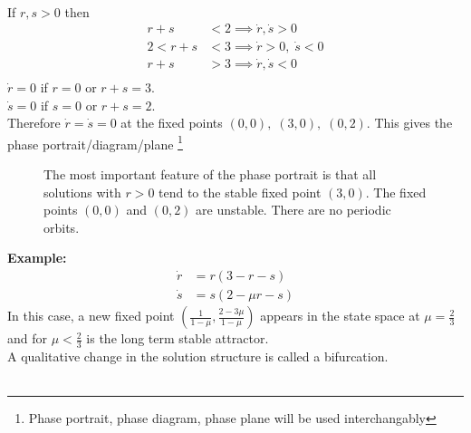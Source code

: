 \documentclass{article}
\newcommand{\example}{\textbf{Example:}}                    %
\begin{document}
\\
If $r,s >0$ then
\begin{align*}
r+s &< 2 \implies \dot{r}, \dot{s} > 0 \\
2 < r+s &< 3 \implies \dot{r} >0 , \; \dot{s} < 0 \\
r+s &> 3 \implies \dot{r}, \dot{s} < 0 \\
\end{align*}
$\dot{r} = 0$ if $r=0$ or $r+s = 3$. \\
$\dot{s} = 0$ if $s=0$ or $r+s = 2$. \\
Therefore $\dot{r} = \dot{s} = 0$ at the fixed points $(0,0), \; (3,0), \; (0,2)$.
This gives the phase portrait/diagram/plane%
\footnote{Phase portrait, phase diagram, phase plane will be used interchangably}
\begin{figure}[H]
\begin{minipage}[c]{0.35\linewidth}
\end{minipage}
\begin{minipage}[c]{0.55\linewidth}
The most important feature of the phase portrait is that all solutions with 
$r >0$ tend to the stable fixed point $(3,0)$. The fixed points $(0,0)$ and
$(0,2)$ are unstable. There are no periodic orbits.
\end{minipage}
\end{figure}
\noindent
\example\   
\begin{align*}
\dot{r} &= r(3 - r -s) \\
\dot{s} &= s(2 - \mu r -s)
\end{align*}
In this case, a new fixed point 
$\displaystyle \left(\frac{1}{1- \mu} , \frac{2 - 3 \mu}{1- \mu} \right)$
appears in the state space at $\mu = \frac{2}{3}$ and for $\mu < \frac{2}{3}$ 
is the long term stable attractor. 
\\
A qualitative change in the solution structure is called a bifurcation.
\\
\\
\end{document}
